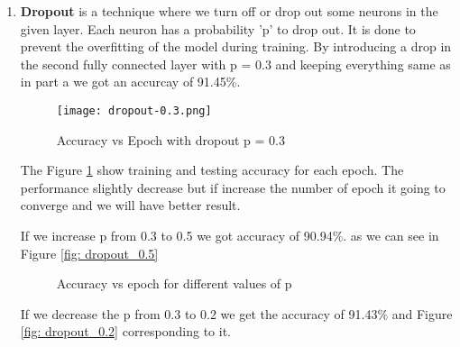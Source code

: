 \documentclass[11pt]{article}
\begin{document}
\begin{enumerate}[label=(\alph*)]
But if the learning rate is too low i.e. 0.001 it gonna converge at a minimum of function but it takes higher number of epoch to reach. Given that we have a 50 epoch learning rate of 0.1 converge the loss function at minima and we got the highest accuracy. 
\item \textbf{Dropout} is a technique where we turn off or drop out some neurons in the given layer. Each neuron has a probability 'p' to drop out. It is done to prevent the overfitting of the model during training. By introducing a drop in the second fully connected layer with p = 0.3 and keeping everything same as in part a we got an accurcay of 91.45\%. 
	\begin{figure}[h]
	\texttt{[image: dropout-0.3.png]}
	\caption{Accuracy vs Epoch with dropout p = 0.3}
	\label{fig: dropout_0.3}
\end{figure}
The Figure \ref{fig: dropout_0.3} show training and testing accuracy for each epoch.  The performance slightly decrease but if increase the number of epoch it going to converge and we will have better result. 

If we increase p from 0.3 to 0.5 we got accuracy of 90.94\%. as we can see in Figure \ref{fig: dropout_0.5}
\begin{figure}[htp]
	\hfill%
    \caption{Accuracy vs epoch for different values of p}
\end{figure}
If we decrease the p from 0.3 to 0.2 we get the accuracy of 91.43\% and Figure \ref{fig: dropout_0.2} corresponding to it.

\end{enumerate}
\end{document}
